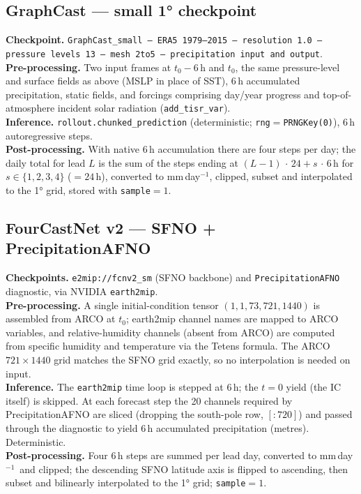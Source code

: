 \documentclass[11pt]{article}
\newcommand{\code}[1]{\texttt{\small #1}}
\newcommand{\mmday}{mm\,day$^{-1}$}
\begin{document}
\subsection{GraphCast --- small \ang{1} checkpoint}
\textbf{Checkpoint.} \code{GraphCast\_small --- ERA5 1979--2015 --- resolution
1.0 --- pressure levels 13 --- mesh 2to5 --- precipitation input and output}.\\
\textbf{Pre-processing.} Two input frames at $t_0{-}6$\,h and $t_0$, the same
pressure-level and surface fields as above (MSLP in place of SST), 6\,h
accumulated precipitation, static fields, and forcings comprising day/year
progress and top-of-atmosphere incident solar radiation
(\code{add\_tisr\_var}).\\
\textbf{Inference.} \code{rollout.chunked\_prediction} (deterministic;
\code{rng}${=}$\code{PRNGKey(0)}), 6\,h autoregressive steps.\\
\textbf{Post-processing.} With native 6\,h accumulation there are four steps per
day; the daily total for lead $L$ is the sum of the steps ending at
$(L{-}1)\,{\cdot}\,24 + s\,{\cdot}\,6$\,h for $s\in\{1,2,3,4\}$ ($=24$\,h),
converted to \mmday, clipped, subset and interpolated to the \ang{1} grid,
stored with \code{sample}${=}1$.

\subsection{FourCastNet v2 --- SFNO + PrecipitationAFNO}
\textbf{Checkpoints.} \code{e2mip://fcnv2\_sm} (SFNO backbone) and
\code{PrecipitationAFNO} diagnostic, via NVIDIA \code{earth2mip}.\\
\textbf{Pre-processing.} A single initial-condition tensor
$(1,1,73,721,1440)$ is assembled from ARCO at $t_0$; earth2mip channel names are
mapped to ARCO variables, and relative-humidity channels (absent from ARCO) are
computed from specific humidity and temperature via the Tetens formula. The ARCO
$721\times1440$ grid matches the SFNO grid exactly, so no interpolation is
needed on input.\\
\textbf{Inference.} The \code{earth2mip} time loop is stepped at 6\,h; the $t{=}0$
yield (the IC itself) is skipped. At each forecast step the 20 channels required
by PrecipitationAFNO are sliced (dropping the south-pole row, $[:720]$) and
passed through the diagnostic to yield 6\,h accumulated precipitation
(metres). Deterministic.\\
\textbf{Post-processing.} Four 6\,h steps are summed per lead day, converted to
\mmday\ and clipped; the descending SFNO latitude axis is flipped to ascending,
then subset and bilinearly interpolated to the \ang{1} grid;
\code{sample}${=}1$.
\end{document}
